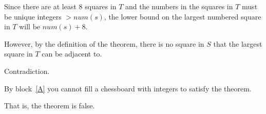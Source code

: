 \documentclass[11pt]{article}
\begin{document}
\begin{problems}
\begin{longFormProof}
\begin{block}[A]
      \step Since there are at least $8$ squares in $T$ and the numbers in the squares in $T$ must be unique integers $> num(s)$, the lower bound on the largest numbered square in $T$ will be $num(s) + 8$.

      \step However, by the definition of the theorem, there is no square in $S$ that the largest square in $T$ can be adjacent to.

      \step Contradiction.

    \end{block}
    
    \step By block~\ref{A} you cannot fill a chessboard with integers to satisfy the theorem.

    \step That is, the theorem is false.
    
  \end{longFormProof}


\end{problems}
\end{document}
